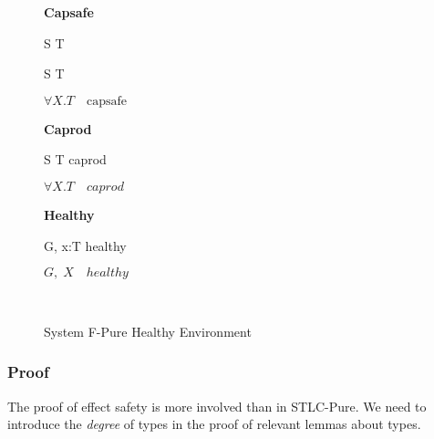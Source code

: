 \begin{figure}
\begin{framed}

\setlength{\columnseprule}{0.4pt}
\begin{multicols}{2}

\textbf{Capsafe}


{ S \to T \quad {} }

{ S \to T \quad {} }

{ \colorbox{shade}{$\forall X.T \quad \text{capsafe}$} }

\columnbreak

\textbf{Caprod}


{ S \to T \quad caprod }

{ \colorbox{shade}{$\forall X.T \quad caprod$} }

\textbf{Healthy}


{ G, \; x:T \quad healthy }

{ \colorbox{shade}{$G, \; X \quad healthy$} }

\hfill\\

\end{multicols}
\end{framed}

\caption{System F-Pure Healthy Environment}
\label{fig:f-pure-healthy-definition}
\end{figure}


\subsubsection{Proof}

The proof of effect safety is more involved than in STLC-Pure. We need
to introduce the \emph{degree} of types in the proof of
relevant lemmas about types.

